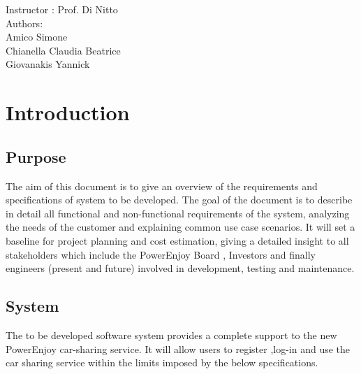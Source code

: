 \documentclass[12pt]{article}
\begin{document}
	 \begin{center}
	 	{\Large Instructor : Prof. Di Nitto}
	 	\vspace{5mm}\\	 
	 	{\Large Authors:}\\
	 	{\Large Amico Simone}\\
	 	{\Large Chianella Claudia Beatrice}\\
	 	{\Large Giovanakis Yannick}
	 \end{center}
	 
	 \newpage
	 
	 \tableofcontents{}
	 
	 \newpage
	 
	 \section{\Large Introduction}
	 
	 \subsection{Purpose}
		The aim of this document	is to give an overview of the 	requirements and specifications of system to be developed. 
		The goal of the document is to describe in detail all functional and non-functional requirements of the system, analyzing the needs of the customer and explaining common use case scenarios.
		It will set a baseline for project planning and cost estimation, giving a detailed insight to all stakeholders which include the PowerEnjoy Board , Investors and finally engineers (present and future) involved  in development, testing and maintenance.
		
	 
	 \subsection{System}
	 The to be developed software system provides a complete support to the new PowerEnjoy car-sharing service. It will allow users to register ,log-in and use the car sharing service within the limits imposed by the below specifications.
	 
	
	 
\end{document}
